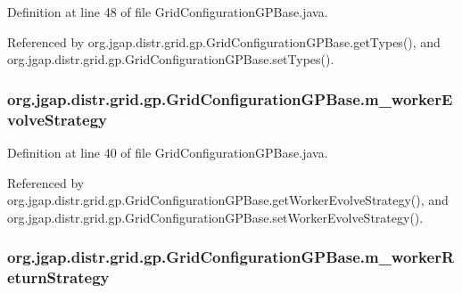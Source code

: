 Definition at line 48 of file Grid\-Configuration\-G\-P\-Base.\-java.



Referenced by org.\-jgap.\-distr.\-grid.\-gp.\-Grid\-Configuration\-G\-P\-Base.\-get\-Types(), and org.\-jgap.\-distr.\-grid.\-gp.\-Grid\-Configuration\-G\-P\-Base.\-set\-Types().

\hypertarget{classorg_1_1jgap_1_1distr_1_1grid_1_1gp_1_1_grid_configuration_g_p_base_a46115eb65e7f8798c2105784b9c4dde3}{
\subsubsection[{m\-\_\-worker\-Evolve\-Strategy}]{ org.\-jgap.\-distr.\-grid.\-gp.\-Grid\-Configuration\-G\-P\-Base.\-m\-\_\-worker\-Evolve\-Strategy\hspace{0.3cm}{\ttfamily [private]}}}\label{classorg_1_1jgap_1_1distr_1_1grid_1_1gp_1_1_grid_configuration_g_p_base_a46115eb65e7f8798c2105784b9c4dde3}


Definition at line 40 of file Grid\-Configuration\-G\-P\-Base.\-java.



Referenced by org.\-jgap.\-distr.\-grid.\-gp.\-Grid\-Configuration\-G\-P\-Base.\-get\-Worker\-Evolve\-Strategy(), and org.\-jgap.\-distr.\-grid.\-gp.\-Grid\-Configuration\-G\-P\-Base.\-set\-Worker\-Evolve\-Strategy().

\hypertarget{classorg_1_1jgap_1_1distr_1_1grid_1_1gp_1_1_grid_configuration_g_p_base_ad39cc1c51254d3bc29337ad5d3d4056b}{
\subsubsection[{m\-\_\-worker\-Return\-Strategy}]{ org.\-jgap.\-distr.\-grid.\-gp.\-Grid\-Configuration\-G\-P\-Base.\-m\-\_\-worker\-Return\-Strategy\hspace{0.3cm}{\ttfamily [private]}}}\label{classorg_1_1jgap_1_1distr_1_1grid_1_1gp_1_1_grid_configuration_g_p_base_ad39cc1c51254d3bc29337ad5d3d4056b}


